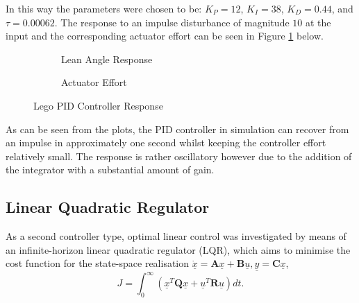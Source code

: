 In this way the parameters were chosen to be: $K_P=12$, $K_I=38$, $K_D=0.44$, and $\tau=0.00062$. The response to an impulse disturbance of magnitude $10$ at the input and the corresponding actuator effort can be seen in Figure \ref{fig:pidLego} below.

\begin{figure}[H]
	\begin{subfigure}{0.5\textwidth}
	\caption{Lean Angle Response}
	\end{subfigure}
	\quad
	\begin{subfigure}{0.5\textwidth}
	\caption{Actuator Effort}
	\end{subfigure}
	\caption{Lego PID Controller Response}
	\label{fig:pidLego}
\end{figure}

As can be seen from the plots, the PID controller in simulation can recover from an impulse in approximately one second whilst keeping the controller effort relatively small. The response is rather oscillatory however due to the addition of the integrator with a substantial amount of gain.

\subsection{Linear Quadratic Regulator}
As a second controller type, optimal linear control was investigated by means of an infinite-horizon linear quadratic regulator (LQR), which aims to minimise the cost function for the state-space realisation $\underline{\dot{x}}=\mathbf{A} \underline{x} + \mathbf{B} \underline{u}, \underline{y} = \mathbf{C} \underline{x}$,
\begin{equation*}
J = \int_{0}^{\infty} (\underline{x}^T \mathbf{Q} \underline{x} + \underline{u}^T \mathbf{R} \underline{u}) dt.
\end{equation*}

